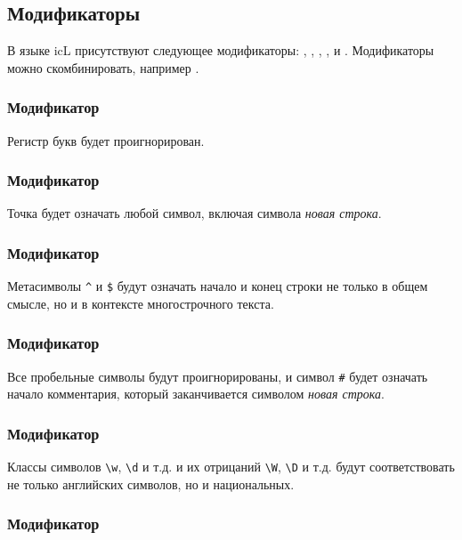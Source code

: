\documentclass[a4paper, 14pt]{extarticle}
\begin{document}
\subsection{Модификаторы}

В языке icL присутствуют следующее модификаторы: , , , ,  и . Модификаторы можно скомбинировать, например .

\subsubsection{Модификатор }

Регистр букв будет проигнорирован. 

\subsubsection{Модификатор }

Точка будет означать любой символ, включая символа {\it новая строка}.

\subsubsection{Модификатор }

Метасимволы \lstinline|^| и \lstinline|$| будут означать начало и конец строки не только в общем смысле, но и в контексте многострочного текста.

\subsubsection{Модификатор }

Все пробельные символы будут проигнорированы, и символ \lstinline|#| будет означать начало комментария, который заканчивается символом {\it новая строка}.

\subsubsection{Модификатор }

Классы символов \lstinline|\w|, \lstinline|\d| и т.д. и их отрицаний \lstinline|\W|, \lstinline|\D| и т.д. будут соответствовать не только английских символов, но и национальных.

\subsubsection{Модификатор }
\end{document}
